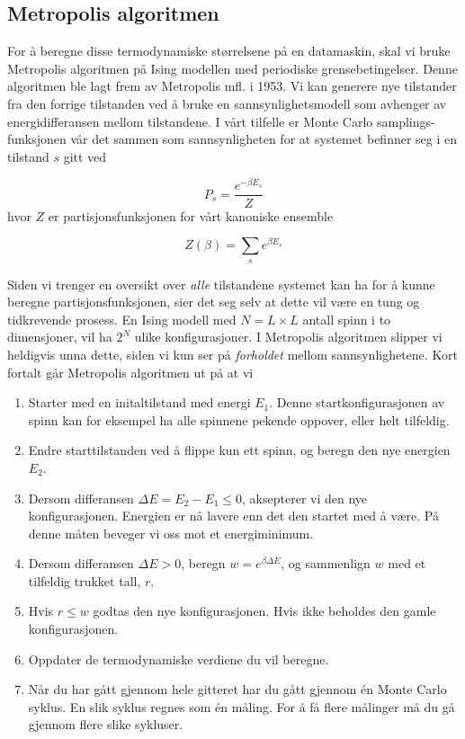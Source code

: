 \documentclass[11pt,a4paper]{article}
\begin{document}
\subsection{Metropolis algoritmen}
For å beregne disse termodynamiske størrelsene på en datamaskin, skal vi bruke Metropolis algoritmen på Ising modellen med periodiske grensebetingelser. Denne algoritmen ble lagt frem av Metropolis mfl. i 1953. Vi kan generere nye tilstander fra den forrige tilstanden ved å bruke en sannsynlighetsmodell som avhenger av energidifferansen mellom tilstandene. I vårt tilfelle er Monte Carlo samplings-funksjonen vår det sammen som sannsynligheten for at systemet befinner seg i en tilstand $s$ gitt ved 

\[P_s = \frac{e^{-\beta E_s}}{Z} \]
hvor $Z$ er partisjonsfunksjonen for vårt kanoniske ensemble

\[Z(\beta) = \sum_s e^{\beta E_s}  \]

Siden vi trenger en oversikt over \textit{alle} tilstandene systemet kan ha for å kunne beregne partisjonsfunksjonen, sier det seg selv at dette vil være en tung og tidkrevende prosess. En Ising modell med $N=L\times L$ antall spinn i to dimensjoner, vil ha $2^N$ ulike konfigurasjoner. I Metropolis algoritmen slipper vi heldigvis unna dette, siden vi kun ser på \textit{forholdet} mellom sannsynlighetene. Kort fortalt går Metropolis algoritmen ut på at vi

\begin{enumerate}
\item Starter med en initaltilstand med energi $E_1$. Denne startkonfigurasjonen av spinn kan for eksempel ha alle spinnene pekende oppover, eller helt tilfeldig.
\item Endre starttilstanden ved å flippe kun ett spinn, og beregn den nye energien $E_2$.
\item Dersom differansen $\Delta E = E_2 - E_1 \le 0 $, aksepterer vi den nye konfigurasjonen. Energien er nå lavere enn det den startet med å være. På denne måten beveger vi oss mot et energiminimum.
\item Dersom differansen $\Delta E > 0$, beregn $w = e^{\beta \Delta E} $, og sammenlign $w$ med et tilfeldig trukket tall, $r$.
\item Hvis $r \le w$ godtas den nye konfigurasjonen. Hvis ikke beholdes den gamle konfigurasjonen. 
\item Oppdater de termodynamiske verdiene du vil beregne.
\item Når du har gått gjennom hele gitteret har du gått gjennom én Monte Carlo syklus. En slik syklus regnes som én måling. For å få flere målinger må du gå gjennom flere slike sykluser.
\end{enumerate}
\end{document}
